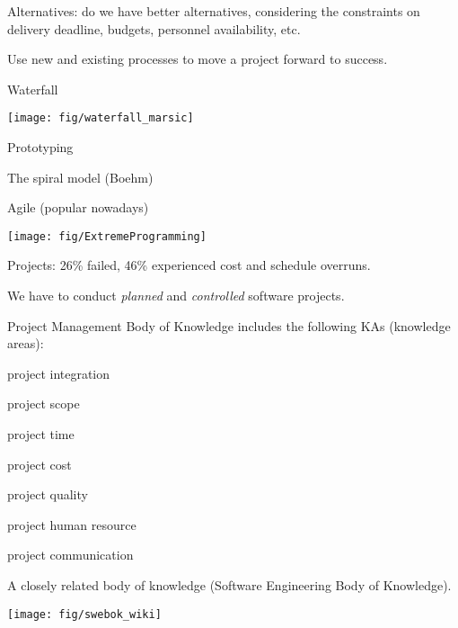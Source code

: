 \documentclass[landscape,30pt]{foils}
\begin{document}
Alternatives: do we have better alternatives, considering the constraints on delivery deadline, budgets, personnel availability, etc. 





Use new and existing processes to move a project forward to success.

Waterfall

\begin{center}
\texttt{[image: fig/waterfall\_marsic]}
\end{center}

Prototyping

The spiral model (Boehm)

Agile (popular nowadays)

\begin{center}
\texttt{[image: fig/ExtremeProgramming]}
\end{center}


Projects: 26\% failed, 46\% experienced cost and schedule overruns.

We have to conduct {\em planned} and {\em controlled} software projects.


Project Management Body of Knowledge includes the following KAs (knowledge areas):

project integration

project scope

project time

project cost

project quality

project human resource

project communication



A closely related body of knowledge (Software Engineering Body of Knowledge).

\begin{center}
\texttt{[image: fig/swebok\_wiki]}
\end{center}
\end{document}
